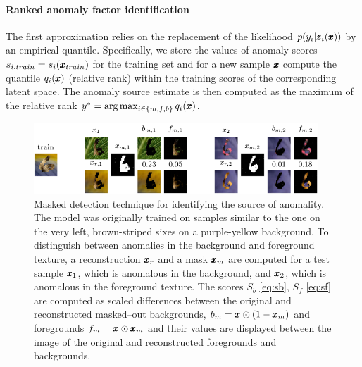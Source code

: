 \paragraph{Ranked anomaly factor identification}
The first approximation relies on the replacement of the likelihood $p(y_i\vert \pmb{{z}}_i(\pmb{{x}}))$ by an empirical quantile.  Specifically, we store the values of anomaly scores $s_{i,train}=s_i(\pmb{{x}}_{train})$ for the training set and for a new sample $\pmb{{x}}$ compute the quantile $q_i(\pmb{{x}})$ (relative rank) within the training scores of the corresponding latent space. The anomaly source estimate is then computed as the maximum of the relative rank $y^* = \arg\max_{i\in\{m,f,b\}}q_i(\pmb{{x}})$.

\begin{figure}
    \centering
    \includegraphics[width=0.95\textwidth]{data/chapter_sgvaegan/fig4_masked_examples.pdf}
    \caption{Masked detection technique for identifying the source of anomality. The model was originally trained on samples similar to the one on the very left, brown-striped sixes on a purple-yellow background. To distinguish between anomalies in the background and foreground texture, a reconstruction $\pmb{{x}}_r$ and a mask $\pmb{{x}}_m$ are computed for a test sample $\pmb{{x}}_1$, which is anomalous in the background, and $\pmb{{x}}_2$, which is anomalous in the foreground texture. The scores $S_b$ \eqref{eq:sb}, $S_f$ \eqref{eq:sf} are computed as scaled differences between the original and reconstructed masked--out backgrounds, $b_m = \pmb{{x}} \odot (1-\pmb{{x}}_m)$ and foregrounds $f_m = \pmb{{x}} \odot \pmb{{x}}_m$ and their values are displayed between the image of the original and reconstructed foregrounds and backgrounds.}
    \label{fig:masked_detection}
\end{figure}

